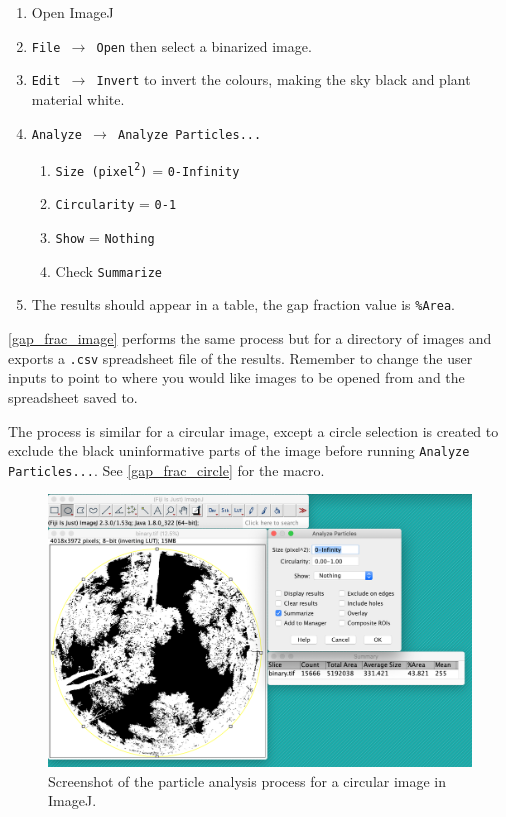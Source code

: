 \documentclass[11pt,a4paper]{article}
\newcommand\menu[1]{\texttt{\color{menu}#1}}  %
\newcommand\file[1]{\texttt{\color{file}#1}}  %
\newcommand\numval[1]{\texttt{\color{numval}#1}}  %
\begin{document}
\begin{enumerate}
	\item{Open ImageJ}
	\item{\menu{File $\rightarrow$ Open} then select a binarized image.} 
	\item{\menu{Edit $\rightarrow$ Invert} to invert the colours, making the sky black and plant material white.}
	\item{\menu{Analyze $\rightarrow$ Analyze Particles...}}
		\begin{enumerate}
			\item{\menu{Size (pixel\textsuperscript{2})} = \numval{0-Infinity}}
			\item{\menu{Circularity} = \numval{0-1}}
			\item{\menu{Show} = \numval{Nothing}}
			\item{Check \menu{Summarize}}
		\end{enumerate}
	\item{The results should appear in a table, the gap fraction value is \menu{\%Area}.}
\end{enumerate}

\autoref{gap_frac_image} performs the same process but for a directory of images and exports a \file{.csv} spreadsheet file of the results. Remember to change the user inputs to point to where you would like images to be opened from and the spreadsheet saved to.

\begin{minipage}{\linewidth}

\end{minipage}

The process is similar for a circular image, except a circle selection is created to exclude the black uninformative parts of the image before running \menu{Analyze Particles...}. See \autoref{gap_frac_circle} for the macro. 

\begin{figure}[H]
	\includegraphics[width=0.8\linewidth]{particles}
	\caption{Screenshot of the particle analysis process for a circular image in ImageJ.}
	\label{particles}
\end{figure}
\end{document}
